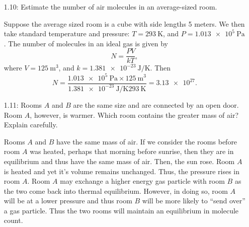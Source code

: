 \documentclass[a4paper, 12pt]{config/homework}
\begin{document}
\begin{enumerate}
\pagebreak
\item[1.10:] Estimate the number of air molecules in an average-sized room.

Suppose the average sized room is a cube with side lengths 5 meters. We then take standard temperature and pressure: \(T=\qty{293}{\kelvin}\), and \(P=\qty{1.013e5}{\pascal}\). The number of molecules in an ideal gas is given by
\[N = \frac{PV}{kT},\]
where \(V=\qty{125}{\meter\cubed}\), and \(k=\qty{1.381e-23}{\joule\per\kelvin}\).
Then
\[N = \frac{\qty{1.013e5}{\pascal}\times\qty{125}{\meter\cubed}}{\qty{1.381e-23}{\joule\per\kelvin}\qty{293}{\kelvin}} = \qty{3.13e27}.\]

\vspace{\baselineskip}
\item[1.11:] Rooms \(A\) and \(B\) are the same size and are connected by an open door. Room \(A\), however, is warmer. Which room contains the greater mass of air? Explain carefully.

Rooms \(A\) and \(B\) have the same mass of air. If we consider the rooms before room \(A\) was heated, perhaps that morning before sunrise, then they are in equilibrium and thus have the same mass of air. Then, the sun rose. Room \(A\) is heated and yet it's volume remains unchanged. Thus, the pressure rises in room \(A\). Room \(A\) may exchange a higher energy gas particle with room \(B\) as the two come back into thermal equilibrium. However, in doing so, room \(A\) will be at a lower pressure and thus room \(B\) will be more likely to ``send over'' a gas particle. Thus the two rooms will maintain an equilibrium in molecule count.


\end{enumerate}
\end{document}
